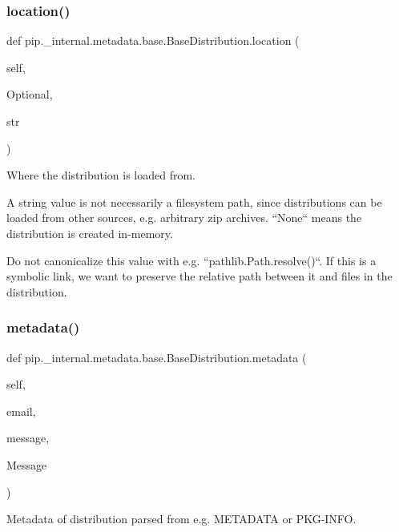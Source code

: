 \subsubsection{\texorpdfstring{location()}{location()}}
{\footnotesize\ttfamily def pip.\+\_\+internal.\+metadata.\+base.\+Base\+Distribution.\+location (\begin{DoxyParamCaption}\item[{}]{self,  }\item[{}]{Optional,  }\item[{}]{str }\end{DoxyParamCaption})}

\begin{DoxyVerb}Where the distribution is loaded from.

A string value is not necessarily a filesystem path, since distributions
can be loaded from other sources, e.g. arbitrary zip archives. ``None``
means the distribution is created in-memory.

Do not canonicalize this value with e.g. ``pathlib.Path.resolve()``. If
this is a symbolic link, we want to preserve the relative path between
it and files in the distribution.
\end{DoxyVerb}
 \mbox{\label{classpip_1_1__internal_1_1metadata_1_1base_1_1BaseDistribution_a21b0254c823585d91ff68fe633d4a27f}} 
\subsubsection{\texorpdfstring{metadata()}{metadata()}}
{\footnotesize\ttfamily def pip.\+\_\+internal.\+metadata.\+base.\+Base\+Distribution.\+metadata (\begin{DoxyParamCaption}\item[{}]{self,  }\item[{}]{email,  }\item[{}]{message,  }\item[{}]{Message }\end{DoxyParamCaption})}

\begin{DoxyVerb}Metadata of distribution parsed from e.g. METADATA or PKG-INFO.\end{DoxyVerb}
 \mbox{\label{classpip_1_1__internal_1_1metadata_1_1base_1_1BaseDistribution_aed3daf5e06155d6bbd467c3130bacaaf}} 
